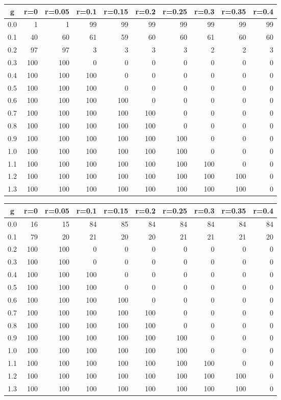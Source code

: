 %
\begin{table}[!tbp]
 \begin{center}
 \begin{tabular}{rrrrrrrrrr}\hline\hline
\multicolumn{1}{c}{g}&\multicolumn{1}{c}{r=0}&\multicolumn{1}{c}{r=0.05}&\multicolumn{1}{c}{r=0.1}&\multicolumn{1}{c}{r=0.15}&\multicolumn{1}{c}{r=0.2}&\multicolumn{1}{c}{r=0.25}&\multicolumn{1}{c}{r=0.3}&\multicolumn{1}{c}{r=0.35}&\multicolumn{1}{c}{r=0.4}\tabularnewline
\hline
0.0&  1&  1& 99& 99& 99& 99& 99& 99&99\tabularnewline
0.1& 40& 60& 61& 59& 60& 60& 61& 60&60\tabularnewline
0.2& 97& 97&  3&  3&  3&  3&  2&  2& 3\tabularnewline
0.3&100&100&  0&  0&  0&  0&  0&  0& 0\tabularnewline
0.4&100&100&100&  0&  0&  0&  0&  0& 0\tabularnewline
0.5&100&100&100&  0&  0&  0&  0&  0& 0\tabularnewline
0.6&100&100&100&100&  0&  0&  0&  0& 0\tabularnewline
0.7&100&100&100&100&100&  0&  0&  0& 0\tabularnewline
0.8&100&100&100&100&100&  0&  0&  0& 0\tabularnewline
0.9&100&100&100&100&100&100&  0&  0& 0\tabularnewline
1.0&100&100&100&100&100&100&  0&  0& 0\tabularnewline
1.1&100&100&100&100&100&100&100&  0& 0\tabularnewline
1.2&100&100&100&100&100&100&100&100& 0\tabularnewline
1.3&100&100&100&100&100&100&100&100& 0\tabularnewline
\hline
\end{tabular}

\end{center}

\end{table}

%
\begin{table}[!tbp]
 \begin{center}
 \begin{tabular}{rrrrrrrrrr}\hline\hline
\multicolumn{1}{c}{g}&\multicolumn{1}{c}{r=0}&\multicolumn{1}{c}{r=0.05}&\multicolumn{1}{c}{r=0.1}&\multicolumn{1}{c}{r=0.15}&\multicolumn{1}{c}{r=0.2}&\multicolumn{1}{c}{r=0.25}&\multicolumn{1}{c}{r=0.3}&\multicolumn{1}{c}{r=0.35}&\multicolumn{1}{c}{r=0.4}\tabularnewline
\hline
0.0& 16& 15& 84& 85& 84& 84& 84& 84&84\tabularnewline
0.1& 79& 20& 21& 20& 20& 21& 21& 21&20\tabularnewline
0.2&100&100&  0&  0&  0&  0&  0&  0& 0\tabularnewline
0.3&100&100&  0&  0&  0&  0&  0&  0& 0\tabularnewline
0.4&100&100&100&  0&  0&  0&  0&  0& 0\tabularnewline
0.5&100&100&100&  0&  0&  0&  0&  0& 0\tabularnewline
0.6&100&100&100&100&  0&  0&  0&  0& 0\tabularnewline
0.7&100&100&100&100&100&  0&  0&  0& 0\tabularnewline
0.8&100&100&100&100&100&  0&  0&  0& 0\tabularnewline
0.9&100&100&100&100&100&100&  0&  0& 0\tabularnewline
1.0&100&100&100&100&100&100&  0&  0& 0\tabularnewline
1.1&100&100&100&100&100&100&100&  0& 0\tabularnewline
1.2&100&100&100&100&100&100&100&100& 0\tabularnewline
1.3&100&100&100&100&100&100&100&100& 0\tabularnewline
\hline
\end{tabular}

\end{center}

\end{table}


